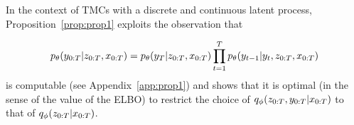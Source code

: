 In the context of TMCs with a discrete and continuous latent process, 
Proposition~\ref{prop:prop1} exploits the observation that

\begin{equation}
\label{backward-decomposition}
p_{\theta}(y_{0:T}|z_{0:T},x_{0:T})=p_{\theta}(y_{T}|z_{0:T},x_{0:T})
 \prod_{t=1}^T p_{\theta}(y_{t-1}|y_t,z_{0:T},x_{0:T})
\end{equation}
is computable (see Appendix~\ref{app:prop1}) and 
shows that it is optimal
(in the sense of the value of the ELBO) to
restrict the choice of $q_\phi(z_{0:T},y_{0:T}|x_{0:T})$ 
to that of $q_\phi(z_{0:T}|x_{0:T})$. 

